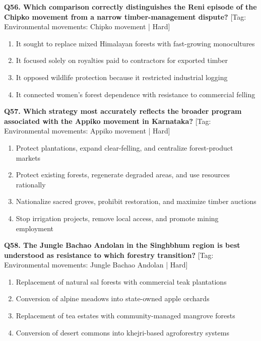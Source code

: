 \noindent\textbf{Q56. Which comparison correctly distinguishes the Reni episode of the Chipko movement from a narrow timber-management dispute?} \hfill [Tag: Environmental movements: Chipko movement | Hard]
\begin{enumerate}[label=(\alph*),topsep=2pt,itemsep=1pt,partopsep=0pt,parsep=0pt]
    \item {It sought to replace mixed Himalayan forests with fast-growing monocultures}
    \item {It focused solely on royalties paid to contractors for exported timber}
    \item {It opposed wildlife protection because it restricted industrial logging}
    \item {It connected women's forest dependence with resistance to commercial felling}
\end{enumerate}
\vspace{2mm}

\noindent\textbf{Q57. Which strategy most accurately reflects the broader program associated with the Appiko movement in Karnataka?} \hfill [Tag: Environmental movements: Appiko movement | Hard]
\begin{enumerate}[label=(\alph*),topsep=2pt,itemsep=1pt,partopsep=0pt,parsep=0pt]
    \item {Protect plantations, expand clear-felling, and centralize forest-product markets}
    \item {Protect existing forests, regenerate degraded areas, and use resources rationally}
    \item {Nationalize sacred groves, prohibit restoration, and maximize timber auctions}
    \item {Stop irrigation projects, remove local access, and promote mining employment}
\end{enumerate}
\vspace{2mm}

\noindent\textbf{Q58. The Jungle Bachao Andolan in the Singhbhum region is best understood as resistance to which forestry transition?} \hfill [Tag: Environmental movements: Jungle Bachao Andolan | Hard]
\begin{enumerate}[label=(\alph*),topsep=2pt,itemsep=1pt,partopsep=0pt,parsep=0pt]
    \item {Replacement of natural sal forests with commercial teak plantations}
    \item {Conversion of alpine meadows into state-owned apple orchards}
    \item {Replacement of tea estates with community-managed mangrove forests}
    \item {Conversion of desert commons into khejri-based agroforestry systems}
\end{enumerate}
\vspace{2mm}


